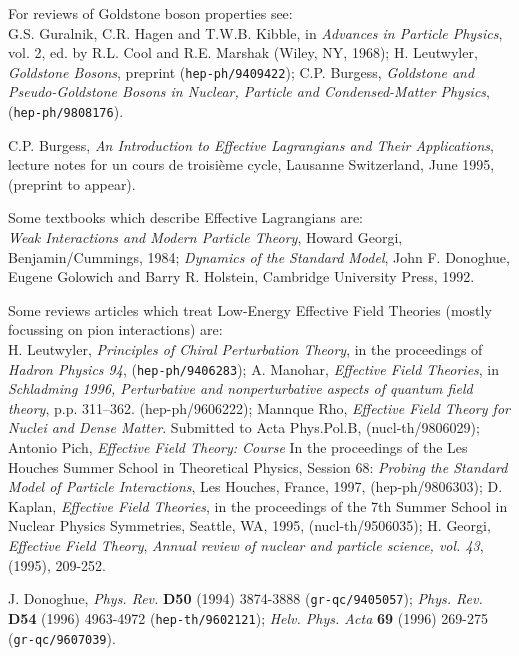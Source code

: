 \documentclass[12pt]{article}
\begin{document}
\begin{thebibliography}{99}
For reviews of Goldstone boson properties see:\\
G.S. Guralnik, C.R. Hagen and T.W.B. Kibble, 
in {\it Advances in Particle Physics}, vol. 2, ed. by R.L. Cool 
and R.E. Marshak (Wiley, NY, 1968);
H. Leutwyler, {\sl Goldstone Bosons}, preprint ({\tt hep-ph/9409422});
C.P. Burgess, {\sl Goldstone and Pseudo-Goldstone Bosons in 
Nuclear, Particle and Condensed-Matter Physics}, ({\tt hep-ph/9808176}).

C.P. Burgess, {\sl An Introduction to Effective Lagrangians 
and Their Applications}, lecture notes for un cours de
troisi\`eme cycle, Lausanne Switzerland, June 1995,
(preprint to appear).

Some textbooks which describe Effective Lagrangians are:\\
{\it Weak Interactions and Modern Particle Theory}, Howard Georgi,
Benjamin/Cummings, 1984;
{\it Dynamics of the Standard Model}, 
John F. Donoghue, Eugene Golowich and
Barry R. Holstein, Cambridge University Press, 1992.

Some reviews articles which treat Low-Energy Effective Field
Theories (mostly focussing on pion interactions) are:\\
H. Leutwyler, {\sl Principles of Chiral Perturbation Theory},
in the proceedings of {\it Hadron Physics 94}, ({\tt hep-ph/9406283});
A. Manohar, {\sl Effective Field Theories},  in {\it Schladming 1996,
Perturbative and nonperturbative  aspects of quantum field theory}, p.p.
311--362. (hep-ph/9606222);
Mannque Rho, {\sl Effective Field Theory for Nuclei and Dense Matter}.
Submitted to Acta Phys.Pol.B, (nucl-th/9806029);
Antonio Pich, {\sl Effective Field Theory: Course} In the proceedings of the
Les Houches Summer School in Theoretical Physics,
Session 68: {\it Probing the Standard Model of Particle Interactions},
Les Houches, France, 1997, (hep-ph/9806303);
D. Kaplan, {\sl Effective Field Theories}, in the proceedings of the 7th Summer
School in Nuclear Physics
Symmetries, Seattle, WA, 1995, (nucl-th/9506035);
H. Georgi, {\sl Effective Field Theory},
{\it Annual review of nuclear and particle science, vol. 43},
(1995), 209-252.

J. Donoghue, {\it Phys. Rev.} {\bf D50} (1994) 3874-3888 
({\tt gr-qc/9405057});
{\it Phys. Rev.} {\bf D54} (1996) 4963-4972 ({\tt hep-th/9602121}); 
{\it Helv. Phys. Acta} {\bf  69} (1996) 269-275
({\tt gr-qc/9607039}). 

\end{thebibliography}
\end{document}
